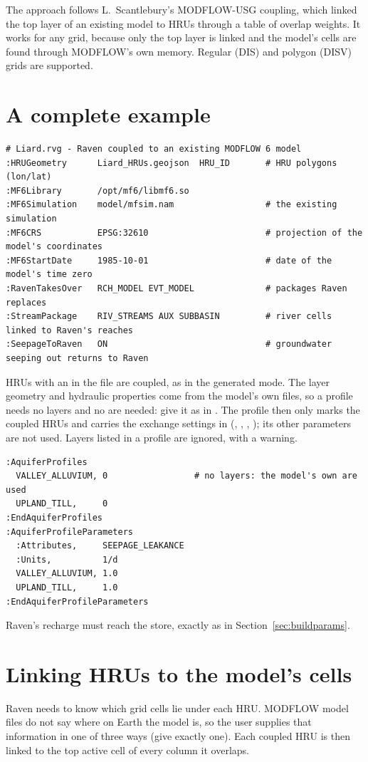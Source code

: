 The approach follows L.~Scantlebury's MODFLOW-USG coupling, which linked the top layer of an existing model to HRUs
through a table of overlap weights. It works for any grid, because only the top layer is linked and the model's cells are
found through MODFLOW's own memory. Regular (DIS) and polygon (DISV) grids are supported.

\section{A complete example}
\begin{lstlisting}
# Liard.rvg - Raven coupled to an existing MODFLOW 6 model
:HRUGeometry      Liard_HRUs.geojson  HRU_ID       # HRU polygons (lon/lat)
:MF6Library       /opt/mf6/libmf6.so
:MF6Simulation    model/mfsim.nam                  # the existing simulation
:MF6CRS           EPSG:32610                       # projection of the model's coordinates
:MF6StartDate     1985-10-01                       # date of the model's time zero
:RavenTakesOver   RCH_MODEL EVT_MODEL              # packages Raven replaces
:StreamPackage    RIV_STREAMS AUX SUBBASIN         # river cells linked to Raven's reaches
:SeepageToRaven   ON                               # groundwater seeping out returns to Raven
\end{lstlisting}
HRUs with an  in the  file are coupled, as in the generated mode. The layer geometry and
hydraulic properties come from the model's own files, so a profile needs no layers and no  are
needed: give it as  in . The profile then only marks the coupled HRUs and carries the
exchange settings in  (, ,
, ); its other parameters are not used. Layers listed in a profile are ignored, with a warning.
\begin{lstlisting}
:AquiferProfiles
  VALLEY_ALLUVIUM, 0                 # no layers: the model's own are used
  UPLAND_TILL,     0
:EndAquiferProfiles
:AquiferProfileParameters
  :Attributes,     SEEPAGE_LEAKANCE
  :Units,          1/d
  VALLEY_ALLUVIUM, 1.0
  UPLAND_TILL,     1.0
:EndAquiferProfileParameters
\end{lstlisting}
Raven's recharge must reach the  store, exactly as in Section~\ref{sec:buildparams}.

\section{Linking HRUs to the model's cells}
Raven needs to know which grid cells lie under each HRU. MODFLOW model files do not say where on Earth the model is, so the
user supplies that information in one of three ways (give exactly one). Each coupled HRU is then linked to the top active
cell of every column it overlaps.

